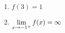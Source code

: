 \documentclass[11pt,fleqn]{article}
\begin{document}
\begin{enumerate}
\begin{enumerate}
\item $f(3)=1$

\item $\displaystyle{\lim_{x \to -1^+}f(x)= \infty}$
\end{enumerate}
\end{enumerate}
\end{document}
